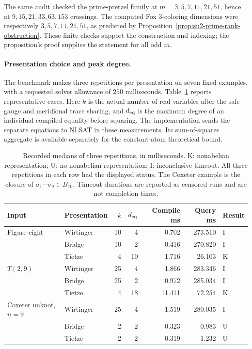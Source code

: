 The same audit checked the prime-pretzel family at
$m=3,5,7,11,21,51$, hence at $9,15,21,33,63,153$ crossings.
The computed Fox $3$-coloring dimensions were respectively
$3,5,7,11,21,51$, as predicted by
Proposition~\ref{prop:su2-prime-rank-obstruction}.  These finite checks
support the construction and indexing; the proposition's proof supplies
the statement for all odd $m$.

\paragraph{Presentation choice and peak degree.}
The benchmark makes three repetitions per presentation on seven fixed
examples, with a requested solver allowance of $250$ milliseconds.
Table~\ref{tab:su2-recorded-bench} reports representative cases.
Here $k$ is the actual number of real variables after the safe gauge and
meridional trace sharing, and $d_{\rm eq}$ is the maximum degree of an
individual compiled equality before squaring.  The implementation sends
the separate equations to NLSAT in these measurements.  Its sum-of-squares
aggregate is available separately for the constant-atom theoretical bound.

\begin{table}[htbp]
\centering
\small
\begin{tabular}{llrrrrl}
\hline
Input & Presentation & $k$ & $d_{\rm eq}$ & Compile ms & Query ms & Result\\
\hline
Figure-eight & Wirtinger & 10 & 4 & 0.702 & 273.510 & I\\
 & Bridge & 10 & 2 & 0.416 & 270.820 & I\\
 & Tietze & 4 & 10 & 1.716 & 26.103 & K\\
$T(2,9)$ & Wirtinger & 25 & 4 & 1.866 & 283.346 & I\\
 & Bridge & 25 & 2 & 0.972 & 285.034 & I\\
 & Tietze & 4 & 18 & 11.411 & 72.254 & K\\
Coxeter unknot, $n=9$ & Wirtinger & 25 & 4 & 1.519 & 280.035 & I\\
 & Bridge & 2 & 2 & 0.323 & 0.983 & U\\
 & Tietze & 2 & 2 & 0.319 & 1.232 & U\\
\hline
\end{tabular}
\caption{Recorded medians of three repetitions, in milliseconds.  K:
nonabelian representation; U: no nonabelian representation; I:
inconclusive timeout.  All three repetitions in each row had the displayed
status.  The Coxeter example is the closure of
$\sigma_1\cdots\sigma_9\in B_{10}$.  Timeout durations are reported
as censored runs and are not completion times.}
\label{tab:su2-recorded-bench}
\end{table}

